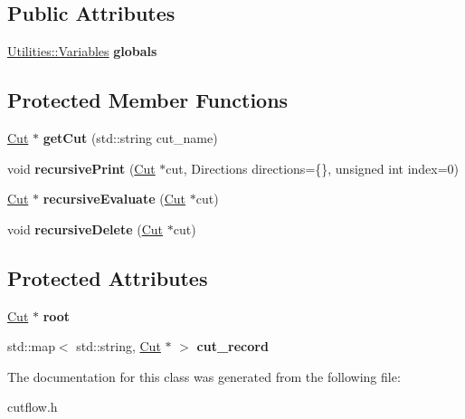 \subsection*{Public Attributes}
\begin{DoxyCompactItemize}
\item 
\hyperlink{classUtilities_1_1Variables}{Utilities\+::\+Variables} {\bfseries globals}\hypertarget{classCutflow_a71390324488ac6ed4a72c41f4a2c1c10}{}\label{classCutflow_a71390324488ac6ed4a72c41f4a2c1c10}

\end{DoxyCompactItemize}
\subsection*{Protected Member Functions}
\begin{DoxyCompactItemize}
\item 
\hyperlink{classCut}{Cut} $\ast$ {\bfseries get\+Cut} (std\+::string cut\+\_\+name)\hypertarget{classCutflow_acee46c9d4c0d77086545500965965996}{}\label{classCutflow_acee46c9d4c0d77086545500965965996}

\item 
void {\bfseries recursive\+Print} (\hyperlink{classCut}{Cut} $\ast$cut, Directions directions=\{\}, unsigned int index=0)\hypertarget{classCutflow_a4acc0465c3fd23989e60db56583b1a3e}{}\label{classCutflow_a4acc0465c3fd23989e60db56583b1a3e}

\item 
\hyperlink{classCut}{Cut} $\ast$ {\bfseries recursive\+Evaluate} (\hyperlink{classCut}{Cut} $\ast$cut)\hypertarget{classCutflow_ac6da50d83b3605d4fd519258ddceb973}{}\label{classCutflow_ac6da50d83b3605d4fd519258ddceb973}

\item 
void {\bfseries recursive\+Delete} (\hyperlink{classCut}{Cut} $\ast$cut)\hypertarget{classCutflow_adc7029b27ff8d742d10c75d6f6342dac}{}\label{classCutflow_adc7029b27ff8d742d10c75d6f6342dac}

\end{DoxyCompactItemize}
\subsection*{Protected Attributes}
\begin{DoxyCompactItemize}
\item 
\hyperlink{classCut}{Cut} $\ast$ {\bfseries root}\hypertarget{classCutflow_a96f2343bfae77c94f2e87b5f3a128d6d}{}\label{classCutflow_a96f2343bfae77c94f2e87b5f3a128d6d}

\item 
std\+::map$<$ std\+::string, \hyperlink{classCut}{Cut} $\ast$ $>$ {\bfseries cut\+\_\+record}\hypertarget{classCutflow_a76f5cbd82750844d379384c7b1243cca}{}\label{classCutflow_a76f5cbd82750844d379384c7b1243cca}

\end{DoxyCompactItemize}


The documentation for this class was generated from the following file\+:\begin{DoxyCompactItemize}
\item 
cutflow.\+h\end{DoxyCompactItemize}
